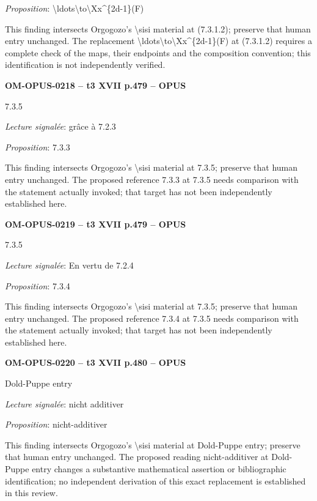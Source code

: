\emph{Proposition}: \textbackslash{}ldots\textbackslash{}to\textbackslash{}Xx\textasciicircum{}\{2d-1\}(F)\par
This finding intersects Orgogozo's \textbackslash{}sisi material at (7.3.1.2); preserve that human entry unchanged. The replacement \textbackslash{}ldots\textbackslash{}to\textbackslash{}Xx\textasciicircum{}\{2d-1\}(F) at (7.3.1.2) requires a complete check of the maps, their endpoints and the composition convention; this identification is not independently verified.\par
\par\noindent\textbf{OM-OPUS-0218 -- t3 XVII p.479 -- OPUS}\par
7.3.5\par
\emph{Lecture signalée}: grâce à 7.2.3\par
\emph{Proposition}: 7.3.3\par
This finding intersects Orgogozo's \textbackslash{}sisi material at 7.3.5; preserve that human entry unchanged. The proposed reference 7.3.3 at 7.3.5 needs comparison with the statement actually invoked; that target has not been independently established here.\par
\par\noindent\textbf{OM-OPUS-0219 -- t3 XVII p.479 -- OPUS}\par
7.3.5\par
\emph{Lecture signalée}: En vertu de 7.2.4\par
\emph{Proposition}: 7.3.4\par
This finding intersects Orgogozo's \textbackslash{}sisi material at 7.3.5; preserve that human entry unchanged. The proposed reference 7.3.4 at 7.3.5 needs comparison with the statement actually invoked; that target has not been independently established here.\par
\par\noindent\textbf{OM-OPUS-0220 -- t3 XVII p.480 -- OPUS}\par
Dold-Puppe entry\par
\emph{Lecture signalée}: nicht additiver\par
\emph{Proposition}: nicht-additiver\par
This finding intersects Orgogozo's \textbackslash{}sisi material at Dold-Puppe entry; preserve that human entry unchanged. The proposed reading nicht-additiver at Dold-Puppe entry changes a substantive mathematical assertion or bibliographic identification; no independent derivation of this exact replacement is established in this review.\par
